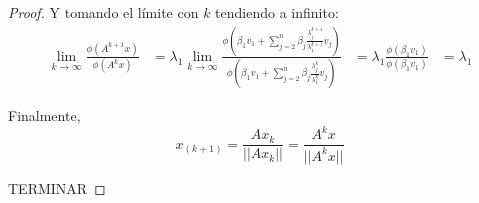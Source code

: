 \begin{proof}
Y tomando el límite con $k$ tendiendo a infinito:
\begin{equation*}
        \begin{aligned}
        \lim\limits_{k \to \infty} \frac{\phi(A^{k+1}x)}{\phi(A^kx)}
            &= \lambda_1 \lim\limits_{k \to \infty}
                    \frac{\phi\left(\beta_1 v_1 +\sum\limits_{j=2}^{n}{\beta_j \frac{\lambda_j^{k+1}}{\lambda_1^{k+1}} v_j} \right)}
                    {\phi\left(\beta_1 v_1 +\sum\limits_{j=2}^{n}{\beta_j \frac{\lambda_j^k}{\lambda_1^k} v_j} \right)}
            &= \lambda_1 \frac{\phi\left(\beta_1 v_1\right)}{\phi\left(\beta_1 v_1 \right)}
            &= \lambda_1
        \end{aligned}
\end{equation*}

Finalmente,
$$x_{(k+1)} = \frac{Ax_k}{||Ax_k||} = \frac{A^kx}{||A^kx||}$$

TERMINAR

\end{proof}
